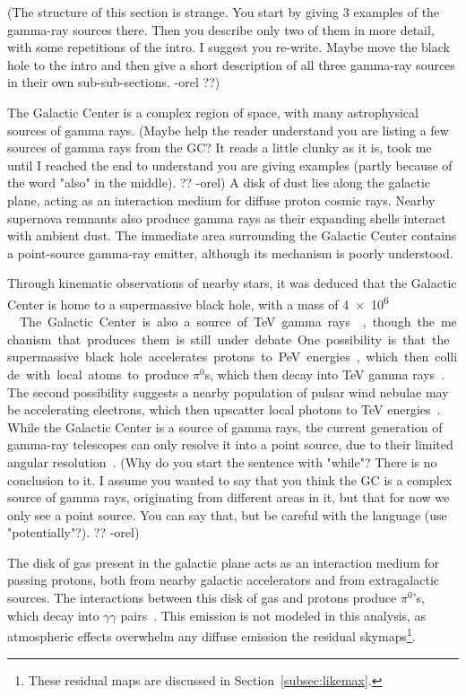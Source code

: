   {\color{red}(The structure of this section is strange. You start by giving 3 examples of the gamma-ray sources there. Then you describe only two of them in more detail, with some repetitions of the intro. I suggest you re-write. Maybe move the black hole to the intro and then give a short description of all three gamma-ray sources in their own sub-sub-sections. -orel ??)}

  The Galactic Center is a complex region of space, with many astrophysical sources of gamma rays.
  {\color{red}(Maybe help the reader understand you are listing a few sources of gamma rays from the GC? It reads a little clunky as it is, took me until I reached the end to understand you are giving examples (partly because of the word "also" in the middle). ?? -orel)}
  A disk of dust lies along the galactic plane, acting as an interaction medium for diffuse proton cosmic rays.
  Nearby supernova remnants also produce gamma rays as their expanding shells interact with ambient dust.
  The immediate area surrounding the Galactic Center contains a point-source gamma-ray emitter, although its mechanism is poorly understood.

  Through kinematic observations of nearby stars, it was deduced that the Galactic Center is home to a supermassive black hole, with a mass of \SI{4e6}{ \Msol{} }~\cite{sgra_massdist}.
  The Galactic Center is also a source of TeV gamma rays~\cite{gc_pointsrc_hess,gc_pointsource_hess2,gc_veritas_pointsource,gc_magic_pointsource}, though the mechanism that produces them is still under debate.
  One possibility is that the supermassive black hole accelerates protons to PeV energies, which then collide with local atoms to produce $\pi^0$s, which then decay into TeV gamma rays~\cite{gc_pevatron}.
  The second possibility suggests a nearby population of pulsar wind nebulae may be accelerating electrons, which then upscatter local photons to TeV energies~\cite{gc_pulsars}.
  While the Galactic Center is a source of gamma rays, the current generation of gamma-ray telescopes can only resolve it into a point source, due to their limited angular resolution~\cite{VeritasGCRidge2015,gc_pointsrc_hess}.
  {\color{red}(Why do you start the sentence with "while"? There is no conclusion to it. I assume you wanted to say that you think the GC is a complex source of gamma rays, originating from different areas in it, but that for now we only see a point source. You can say that, but be careful with the language (use "potentially"?). ?? -orel)}

  The disk of gas present in the galactic plane acts as an interaction medium for passing protons, both from nearby galactic accelerators and from extragalactic sources.
  The interactions between this disk of gas and protons produce $\pi^0$'s, which decay into $\gamma\gamma$ pairs~\cite{hess_gc_diffuse}.
  This emission is not modeled in this analysis, as atmospheric effects overwhelm any diffuse emission the residual skymaps\footnote{These residual maps are discussed in Section~\ref{subsec:likemax}.}.


